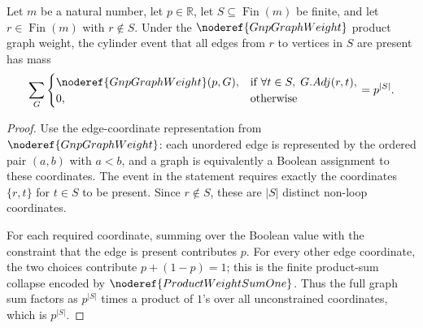 \begin{helper}[GnpVertexCylinderSum]
Let \(m\) be a natural number, let \(p\in\mathbb R\), let
\(S\subseteq \operatorname{Fin}(m)\) be finite, and let
\(r\in\operatorname{Fin}(m)\) with \(r\notin S\).  Under the
\(\noderef{GnpGraphWeight}\) product graph weight, the cylinder event that
all edges from \(r\) to vertices in \(S\) are present has mass
\[
\sum_G
\begin{cases}
\noderef{GnpGraphWeight}(p,G),
&\text{if }\forall t\in S,\;G.Adj(r,t),\\
0,&\text{otherwise}
\end{cases}
=p^{|S|}.
\]
\end{helper}
\begin{proof}
Use the edge-coordinate representation from \(\noderef{GnpGraphWeight}\):
each unordered edge is represented by the ordered pair \((a,b)\) with
\(a<b\), and a graph is equivalently a Boolean assignment to these
coordinates.  The event in the statement requires exactly the coordinates
\(\{r,t\}\) for \(t\in S\) to be present.  Since \(r\notin S\), these are
\(|S|\) distinct non-loop coordinates.

For each required coordinate, summing over the Boolean value with the
constraint that the edge is present contributes \(p\).  For every other edge
coordinate, the two choices contribute \(p+(1-p)=1\); this is the finite
product-sum collapse encoded by \(\noderef{ProductWeightSumOne}\).  Thus the
full graph sum factors as \(p^{|S|}\) times a product of \(1\)'s over all
unconstrained coordinates, which is \(p^{|S|}\).
\end{proof}
